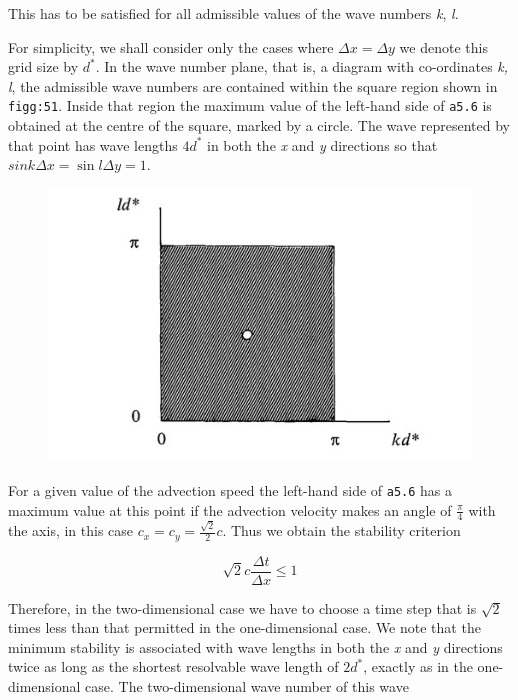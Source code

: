 This has to be satisfied for all admissible values of the wave numbers
\emph{k}, \emph{l}.

For simplicity, we shall consider only the cases where
\(\Delta x = \Delta y\) we denote this grid size by \(d^{*}\). In the
wave number plane, that is, a diagram with co-ordinates \emph{k, l}, the
admissible wave numbers are contained within the square region shown in
\texttt{figg:51}. Inside that region the maximum value of the left-hand
side of \texttt{a5.6} is obtained at the centre of the square, marked by
a circle. The wave represented by that point has wave lengths \(4d^*\)
in both the \emph{x} and \emph{y} directions so that
\(sink{\Delta x} = \sin{l\Delta y} = 1\).

\begin{figure}
\centering
\includegraphics[keepaspectratio]{figs/NM/pic51.jpg}
\caption{} \label{fig:}
\end{figure}

For a given value of the advection speed the left-hand side of
\texttt{a5.6} has a maximum value at this point if the advection
velocity makes an angle of \(\frac{\pi}{4}\) with the axis, in this case
\(c_{x} = c_{y} = \frac{\sqrt{2}}{2}c\). Thus we obtain the stability
criterion

{\[\sqrt{2}c\frac{\Delta t}{\Delta x} \leq 1\]}

Therefore, in the two-dimensional case we have to choose a time step
that is \(\sqrt{2}\) times less than that permitted in the
one-dimensional case. We note that the minimum stability is associated
with wave lengths in both the \emph{x} and \emph{y} directions twice as
long as the shortest resolvable wave length of \({2d}^{*}\), exactly as
in the one-dimensional case. The two-dimensional wave number of this
wave

